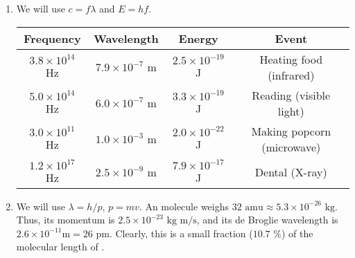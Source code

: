 \documentclass[10pt]{article}
\begin{document}
\begin{enumerate}
                \item We will use $c = f\lambda$ and $E = hf$.
                        \begin{center}
                        \begin{tabular}{| c | c | c | c |}
                        \hline
                        \textbf{Frequency}      &       \textbf{Wavelength}     &       \textbf{Energy}         &       \textbf{Event}\\\hline
                        $3.8 \times 10^{14}$ Hz & $7.9 \times 10^{-7}$ m        & $2.5 \times 10^{-19}$ J       &       Heating food (infrared)\\
                        $5.0 \times 10^{14}$ Hz & $6.0 \times 10^{-7}$ m        & $3.3 \times 10^{-19}$ J       &       Reading (visible light)\\
                        $3.0 \times 10^{11}$ Hz & $1.0 \times 10^{-3}$ m        & $2.0 \times 10^{-22}$ J       &       Making popcorn (microwave)\\
                        $1.2 \times 10^{17}$ Hz & $2.5 \times 10^{-9}$ m        & $7.9 \times 10^{-17}$ J       &       Dental (X-ray)\\\hline
                        \end{tabular}
                        \end{center}

                \item We will use $\lambda = h/p$, $p = mv$.
                An  molecule weighs $32 \text{ amu} \approx 5.3 \times 10^{-26} \text{ kg}$. Thus, its momentum is $2.5 \times 10^{-23}
                \text{ kg m/s}$, and its de Broglie wavelength is $2.6 \times 10^{-11} \text{m} = 26 \text{ pm}$. Clearly, this is
                a small fraction ($10.7 \text{ \%}$) of the molecular length of .


\end{enumerate}
\end{document}
